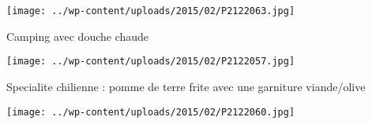 \begin{center} \texttt{[image: ../wp-content/uploads/2015/02/P2122063.jpg]} \end{center}



 Camping avec douche chaude

\begin{center} \texttt{[image: ../wp-content/uploads/2015/02/P2122057.jpg]} \end{center}

Specialite chilienne : pomme de terre frite avec une garniture viande/olive

\begin{center} \texttt{[image: ../wp-content/uploads/2015/02/P2122060.jpg]} \end{center}




 
 
